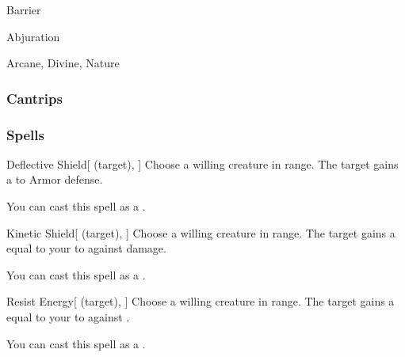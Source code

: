 \newpage
\begin{spellsection}{Barrier}

\begin{spellheader}
\end{spellheader}


 Abjuration

 Arcane, Divine, Nature

\subsubsection{Cantrips}


\end{spellsection}


\subsubsection{Spells}


\lowercase{\hypertarget{spell:Deflective Shield}{}}\label{spell:Deflective Shield}
\begin{attuneability}[\nth{1}]{\hypertarget{spell:Deflective Shield}{Deflective Shield}}[ (target), ]
Choose a willing creature in \rngclose range.
The target gains a   to Armor defense.

You can cast this spell as a .
\end{attuneability}
\vspace{0.25em}



\lowercase{\hypertarget{spell:Kinetic Shield}{}}\label{spell:Kinetic Shield}
\begin{attuneability}[\nth{1}]{\hypertarget{spell:Kinetic Shield}{Kinetic Shield}}[ (target), ]
Choose a willing creature in \rngclose range.
The target gains a  equal to your  to  against  damage.

You can cast this spell as a .
\end{attuneability}
\vspace{0.25em}



\lowercase{\hypertarget{spell:Resist Energy}{}}\label{spell:Resist Energy}
\begin{attuneability}[\nth{1}]{\hypertarget{spell:Resist Energy}{Resist Energy}}[ (target), ]
Choose a willing creature in \rngclose range.
The target gains a  equal to your  to  against .

You can cast this spell as a .
\end{attuneability}
\vspace{0.25em}



